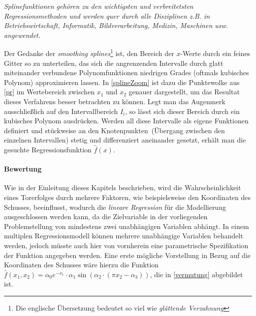 \begin{itemize}

\textit{\glqq Splinefunktionen gehören zu den wichtigsten und verbreitetsten Regressionsmethoden und werden quer durch alle Disziplinen z.B. in Betriebswirtschaft, Informatik, Bildverarbeitung, Medizin, Maschinen usw. angewendet.\grqq} 

Der Gedanke der \textit{smoothing splines}\footnote{Die englische Übersetzung bedeutet so viel wie \textit{glättende Verzahnung}} ist, den Bereich der $x$-Werte durch ein feines Gitter so zu unterteilen, das sich die angrenzenden Intervalle durch glatt miteinander verbundene Polynomfunktionen niedrigen Grades (oftmals kubisches Polynom) approximieren lassen. In \vref{splineZoom} ist dazu die Punktewolke aus \vref{pr} im Wertebereich zwischen $x_1$ und $x_2$ genauer dargestellt, um das Resultat dieses Verfahrens besser betrachten zu können. Legt man das Augenmerk ausschließlich auf den Intervallbereich $I_i$, so lässt sich dieser Bereich durch ein kubisches Polynom ausdrücken. Werden all diese Intervalle als eigene Funktionen definiert und stückweise an den \glqq Knotenpunkten\grqq~(Übergang zwischen den einzelnen Intervallen) stetig und differenziert aneinander gesetzt, erhält man die gesuchte Regressionsfunktion $\hat{f}(x)$.



\end{itemize}

\paragraph{Bewertung} Wie in der Einleitung dieses Kapitels beschrieben, wird die Wahrscheinlichkeit eines Torerfolges durch mehrere Faktoren, wie beispielsweise den Koordinaten des Schusses, beeinflusst, wodurch die \textit{lineare Regression} für die Modellierung ausgeschlossen werden kann, da die Zielvariable in der vorliegenden Problemstellung von mindestens zwei unabhängigen Variablen abhängt. In einem multiplen Regressionsmodell können mehrere unabhängige Variablen behandelt werden, jedoch müsste auch hier von vornherein eine parametrische Spezifikation der Funktion angegeben werden. Eine erste mögliche Vorstellung in Bezug auf die Koordinaten des Schusses wäre hierzu die Funktion $\hat{f}(x_1,x_2) = \alpha_0 e^{-x_1} \cdot \alpha_1\sin(\alpha_2 \cdot (\pi x_2 - \alpha_3))$, die in \vref{vermutung} abgebildet ist. 


